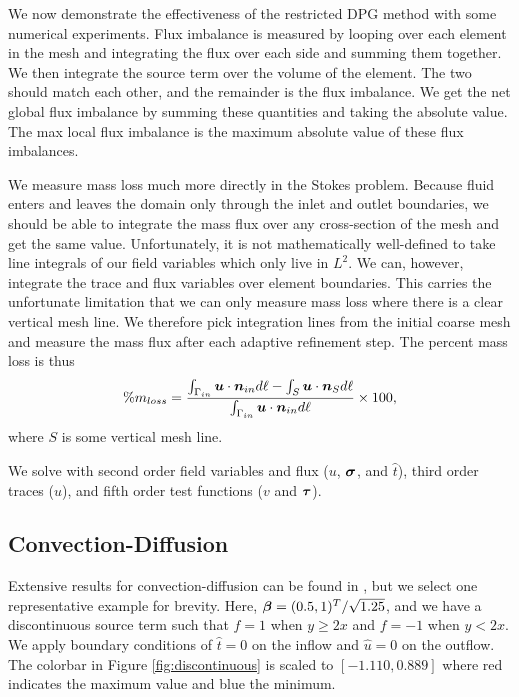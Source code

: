 \documentclass[Proposal.tex]{subfiles}
\begin{document}
We now demonstrate the effectiveness of the restricted DPG method with some numerical experiments.
Flux imbalance is measured by looping over each element in the mesh and
integrating the flux over each side and summing them together. We then
integrate the source term over the volume of the element. The two should match
each other, and the remainder is the flux imbalance. We get the net global
flux imbalance by summing these quantities and taking the absolute value. The
max local flux imbalance is the maximum absolute value of these flux
imbalances. 

We measure mass loss much more directly in the Stokes problem. Because
fluid enters and leaves the domain only through the inlet and outlet
boundaries, we should be able to integrate the mass flux over any
cross-section of the mesh and get the same value. Unfortunately, it is not
mathematically well-defined to take line integrals of our field variables which only
live in $L^2$. We can, however, integrate the trace and flux variables over element boundaries.
This carries the unfortunate limitation that we can only measure mass loss
where there is a clear vertical mesh line. We therefore pick integration lines
from the initial coarse mesh and measure the mass flux after each adaptive refinement
step. The percent mass loss is thus
\[
\%m_{loss}=\frac{\int_{\Gamma_{in}}\boldsymbol u\cdot\boldsymbol n_{in}d\ell-\int_S\boldsymbol u\cdot\boldsymbol n_Sd\ell}
{\int_{\Gamma_{in}}\boldsymbol u\cdot\boldsymbol n_{in}d\ell}\times100,
\]
where $S$ is some vertical mesh line.

We solve with second order field variables and flux ($u$, $\boldsymbol\sigma$, and $\hat
t$), third order traces ($\hat u$), and fifth order test functions ($v$ and
$\boldsymbol\tau$).

\subsection{Convection-Diffusion}
Extensive results for convection-diffusion can be found in \cite{Ellis2013Report}, but we select one representative example for brevity.
Here, $\boldsymbol\beta=(0.5,1)^T/\sqrt{1.25}$, and we have a discontinuous source term
such that $f=1$ when $y\ge2x$ and $f=-1$ when $y<2x$. We apply boundary
conditions of $\hat t=0$ on the inflow and $\hat u=0$ on the outflow. 
The colorbar in Figure \ref{fig:discontinuous} is
scaled to  $[-1.110,0.889]$ where red indicates the maximum value and blue the minimum.
\end{document}
